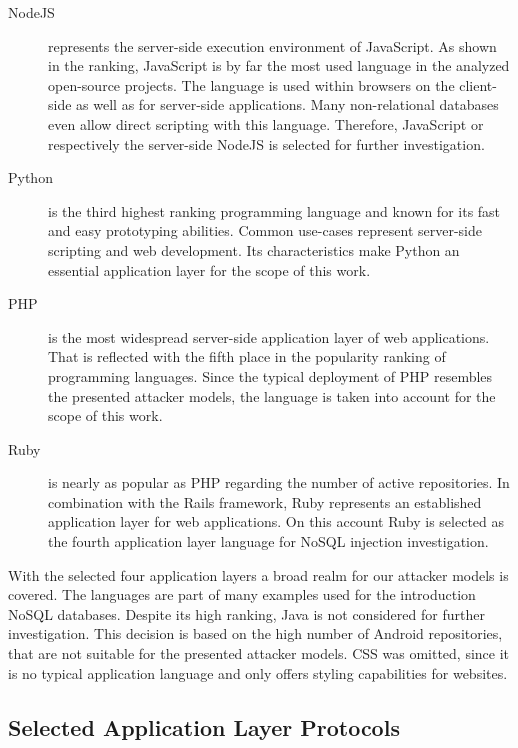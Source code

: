 \begin{description}
\item [NodeJS] represents the server-side execution environment of JavaScript. As shown in the ranking, JavaScript is by far the most used language in the analyzed open-source projects. The language is used within browsers on the client-side as well as for server-side applications. Many non-relational databases even allow direct scripting with this language. Therefore, JavaScript or respectively the server-side NodeJS is selected for further investigation.
\item [Python] is the third highest ranking programming language and known for its fast and easy prototyping abilities. Common use-cases represent server-side scripting and web development. Its characteristics make Python an essential application layer for the scope of this work.
\item [PHP] is the most widespread server-side application layer of web applications. That is reflected with the fifth place in the popularity ranking of programming languages. Since the typical deployment of PHP resembles the presented attacker models, the language is taken into account for the scope of this work.
\item [Ruby] is nearly as popular as PHP regarding the number of active repositories. In combination with the Rails framework, Ruby represents an established application layer for web applications. On this account Ruby is selected as the fourth application layer language for NoSQL injection investigation.
\end{description}

With the selected four application layers a broad realm for our attacker models is covered. The languages are part of many examples used for the introduction NoSQL databases. Despite its high ranking, Java is not considered for further investigation. This decision is based on the high number of Android repositories, that are not suitable for the presented attacker models. CSS was omitted, since it is no typical application language and only offers styling capabilities for websites.


\subsection{Selected Application Layer Protocols}
\label{sec:selectedAppLayerProtocols}

